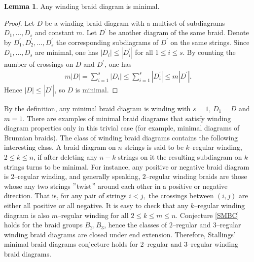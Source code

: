 \documentclass[11pt]{amsart}
\theoremstyle{plain}
\theoremstyle{definition}
\newtheorem{Lemma}[Theorem]{Lemma}
\numberwithin{equation}{section}
\begin{document}
\begin{Lemma}\label{WindingWordsAreGeodesic}
Any winding braid diagram is minimal.
\end{Lemma}
\begin{proof}
Let $D$ be a winding braid diagram with a multiset of subdiagrams $D_1, \ldots, D_s$ and constant $m$. Let $D^\prime$ be another diagram of the same braid. Denote by $D_1^\prime, D_2^\prime, \ldots, D_s^\prime$ the corresponding subdiagrams of $D^\prime$ on the same strings. Since $D_1, \ldots, D_s$ are minimal, one has $|D_i| \leq |D_i^\prime|$ for all $1 \leq i \leq s$. By counting the number of crossings on $D$ and $D^\prime$, one has
\begin{align*}
m |D| = \sum_{i = 1}^s |D_i| \leq \sum_{i=1}^s |D_i^\prime| \leq m |D^\prime|.
\end{align*}
Hence $|D| \leq |D^\prime|$, so $D$ is minimal.
\end{proof}
By the definition, any minimal braid diagram is winding with $s=1$, $D_1 = D$ and $m=1$. There are examples of minimal braid diagrams that satisfy winding diagram properties only in this trivial case (for example, minimal diagrams of Brunnian braids). The class of winding braid diagrams contains the following interesting class. A braid diagram on $n$ strings is said to be $k$--regular winding, $2\leq k \leq n$, if after deleting any $n-k$ strings on it the resulting subdiagram on $k$ strings turns to be minimal. For instance, any positive or negative braid diagram is $2$--regular winding, and generally speaking, $2$--regular winding braids are those whose any two strings $"$twist$"$ around each other in a positive or negative direction. That is, for any pair of strings $i<j,$ the crossings between $(i,j)$ are either all positive or all negative. It is easy to check that any $k$--regular winding diagram is also $m$--regular winding for all $2 \leq k \leq m \leq n$. Conjecture \ref{SMBC} holds for the braid groups $B_2, B_3$, hence the classes of $2$--regular and $3$--regular winding braid diagrams are closed under end extension. Therefore, Stallings' minimal braid diagrams conjecture holds for $2$--regular and $3$--regular winding braid diagrams.
\end{document}
